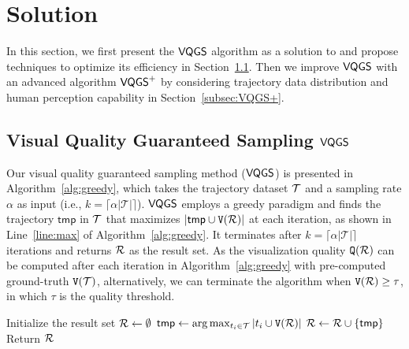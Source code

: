 \section{\prob{} Solution}\label{sec:sol}
In this section,  we first present the $\mathsf{VQGS}$ algorithm as a solution to \prob{} and propose techniques to optimize its efficiency in Section~\ref{sec:greedy}.
Then we improve $\mathsf{VQGS}$ with an advanced algorithm $\mathsf{VQGS}^+$ by considering trajectory data distribution and human perception capability in Section~\ref{subsec:VQGS+}.


\subsection{Visual Quality Guaranteed Sampling $\mathsf{VQGS}$}\label{sec:greedy}

Our visual quality guaranteed sampling method ($\mathsf{VQGS}$) is presented in Algorithm~\ref{alg:greedy},
which takes the trajectory dataset $\mathcal{T}$ and a sampling rate $\alpha$ as input (i.e., $k=\lceil \alpha |\mathcal{T}| \rceil$).
$\mathsf{VQGS}$ employs a greedy paradigm and finds the trajectory $\mathsf{tmp}$ in $\mathcal{T}$ that maximizes $| \mathsf{tmp} \cup \mathtt{V}(\mathcal{R})|$ at each iteration, as shown in Line~\ref{line:max} of Algorithm~\ref{alg:greedy}.
It terminates after $k=\lceil \alpha |\mathcal{T}| \rceil$ iterations and returns $\mathcal{R}$ as the result set.
As the visualization quality $\mathtt{Q}(\mathcal{R})$ can be computed after each iteration in Algorithm~\ref{alg:greedy} with pre-computed ground-truth $\mathtt{V}(\mathcal{T})$,
alternatively, we can terminate the algorithm when $\mathtt{V}(\mathcal{R})\ge \tau$, in which $\tau$ is the quality threshold.

\begin{algorithm}
    \caption{$\vats(\D, k=\lceil \alpha |\mathcal{T}| \rceil$)} \label{alg:greedy}
    \begin{algorithmic}[1]
    \State Initialize the result set $\mathcal{R} \leftarrow \emptyset$
        \State $\mathsf{tmp} \leftarrow \arg\max_{t_i \in \mathcal{T}} |t_i \cup \mathtt{V}(\mathcal{R})|$ \label{line:max}
        \State $\mathcal{R} \leftarrow \mathcal{R} \cup \{ \mathsf{tmp} \}$
    \EndWhile
    \State Return $\mathcal{R}$
    \end{algorithmic}
\end{algorithm}


